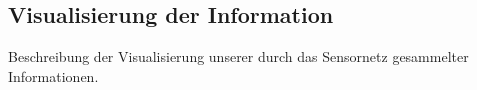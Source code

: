 \subsection{Visualisierung der Information}\label{ss:Visualisierung}

Beschreibung der Visualisierung unserer durch das Sensornetz gesammelter Informationen.
